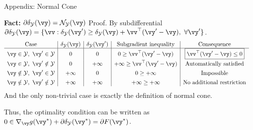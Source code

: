 \documentclass[10pt,aspectratio=169,xcolor=dvipsnames]{beamer}
\begin{document}
\begin{frame}[allowframebreaks]{Appendix: Normal Cone}
    \begin{block}{\small\textbf{Fact:} $\partial \delta_{\mathcal{Y}}(\vy) = \mathcal{N}_{\mathcal{Y}}(\vy)$}
        Proof. By subdifferential $\partial \delta_{\mathcal{Y}}(\vy) = \{\vv : \delta_{\mathcal{Y}}(\vy') \geq \delta_{\mathcal{Y}}(\vy) + \vv^\top (\vy' - \vy),\ \forall \vy'\}$.
        \[
            \begin{array}{c|c|c|c|c}
            \text{Case}
            & \delta_{\mathcal{Y}}(\vy)
            & \delta_{\mathcal{Y}}(\vy')
            & \text{Subgradient inequality}
            & \text{Consequence}
            \\
            \hline
            \vy\in \mathcal{Y},\ \vy'\in \mathcal{Y}
            & 0
            & 0
            & 0\ge \vv^\top(\vy'-\vy)
            & \boxed{\vv^\top(\vy'-\vy)\le 0}
            \\[4pt]

            \vy\in \mathcal{Y},\ \vy'\notin \mathcal{Y}
            & 0
            & +\infty
            & +\infty\ge \vv^\top(\vy'-\vy)
            & \text{Automatically satisfied}
            \\[4pt]

            \vy\notin \mathcal{Y},\ \vy'\in \mathcal{Y}
            & +\infty
            & 0
            & 0\ge +\infty
            & \text{Impossible}
            \\[4pt]

            \vy\notin \mathcal{Y},\ \vy'\notin \mathcal{Y}
            & +\infty
            & +\infty
            & +\infty\ge +\infty
            & \text{No additional restriction}
            \end{array}
        \]
        And the only non-trivial case is exactly the definition of normal cone.
    \end{block}
    Thus, the optimality condition can be written as $0 \in \nabla_{\vy} g(\vy^*) + \partial \delta_{\mathcal{Y}}(\vy^*) = \partial F(\vy^*)$.
\end{frame}
\end{document}
